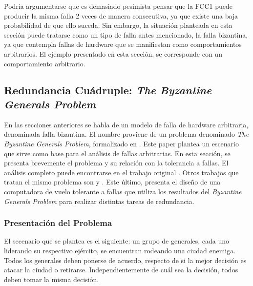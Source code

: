 Podría argumentarse que es demasiado pesimista pensar que la FCC1 puede producir la misma falla 2 veces de manera consecutiva, ya que existe una baja probabilidad de que ello suceda. Sin embargo, la situación planteada en esta sección puede tratarse como un tipo de falla antes mencionado, la falla bizantina, ya que contempla fallas de hardware que se manifiestan como comportamientos arbitrarios. El ejemplo presentado en esta sección, se corresponde con un comportamiento arbitrario.

\subsection{Redundancia Cuádruple: \textit{The Byzantine Generals Problem}}

En las secciones anteriores se habla de un modelo de falla de hardware arbitraria, denominada falla bizantina. El nombre proviene de un problema denominado \textit{The Byzantine Generals Problem}, formalizado en \cite{lamport2019byzantine}. Este paper plantea un escenario que sirve como base para el análisis de fallas arbitrarias. En esta sección, se presenta brevemente el problema y su relación con la tolerancia a fallas. El análisis completo puede encontrarse en el trabajo original \cite{lamport2019byzantine}. Otros trabajos que tratan el mismo problema son \cite{pease1980reaching} y \cite{wensley1978sift}. Este último, presenta el diseño de una computadora de vuelo tolerante a fallas que utiliza los resultados del \textit{Byzantine Generals Problem} para realizar distintas tareas de redundancia.

\subsubsection{Presentación del Problema}

El secenario que se plantea es el siguiente: un grupo de generales, cada uno liderando su respectivo ejército, se encuentran rodeando una ciudad enemiga. Todos los generales deben ponerse de acuerdo, respecto de si la mejor decisión es atacar la ciudad o retirarse. Independientemente de cuál sea la decisión, todos deben tomar la misma decisión. 


